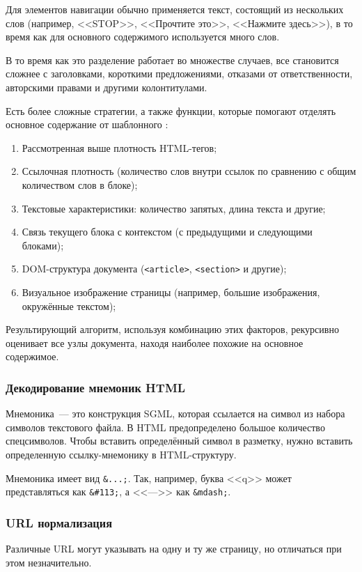 Для элементов навигации обычно применяется текст, состоящий из нескольких слов (например, <<STOP>>, <<Прочтите это>>, <<Нажмите здесь>>), в то время как для основного содержимого используется много слов.

В то время как это разделение работает во множестве случаев, все становится сложнее с заголовками, короткими предложениями, отказами от ответственности, авторскими правами и другими колонтитулами.

Есть более сложные стратегии, а также функции, которые помогают отделять основное содержание от шаблонного \cite{kohlschutter10}:
\begin{enumerate}
    \item Рассмотренная выше плотность HTML-тегов;
    \item Ссылочная плотность (количество слов внутри ссылок по сравнению с общим количеством слов в блоке);
    \item Текстовые характеристики: количество запятых, длина текста и другие;
    \item Связь текущего блока с контекстом (с предыдущими и следующими блоками);
    \item DOM-структура документа (\verb|<article>|, \verb|<section>| и другие);
    \item Визуальное изображение страницы (например, большие изображения, окружённые текстом);
\end{enumerate}

Результирующий алгоритм, используя комбинацию этих факторов, рекурсивно оценивает все узлы документа, находя наиболее похожие на основное содержимое.

\subsubsection{Декодирование мнемоник HTML} \label{sssec:html-mnemonics}
Мнемоника~--- это конструкция SGML, которая ссылается на символ из набора символов текстового файла. В HTML предопределено большое количество спецсимволов. Чтобы вставить определённый символ в разметку, нужно вставить определенную ссылку-мнемонику в HTML-структуру.

Мнемоника имеет вид \verb|&...;|. Так, например, буква <<q>> может представляться как \verb|&#113;|, а <<--->> как \verb|&mdash;|.

\subsubsection{URL нормализация} \label{sssec:url-normalization}
Различные URL могут указывать на одну и ту же страницу, но отличаться при этом незначительно.

